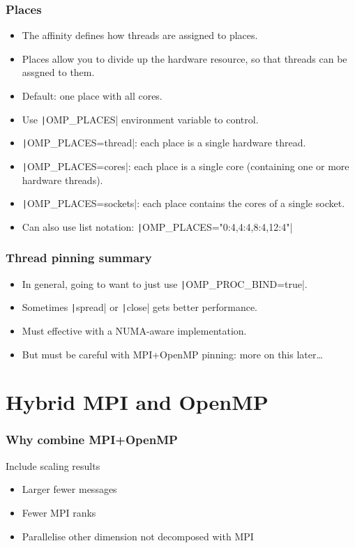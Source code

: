 \documentclass{beamer}
\begin{document}
\begin{frame}
\frametitle{Places}
\begin{itemize}
  \item The affinity defines how threads are assigned to places.
  \item Places allow you to divide up the hardware resource, so that threads can be assgned to them.
  \item Default: one place with all cores.
  \item Use \texttt|OMP_PLACES| environment variable to control.
  \item \texttt|OMP_PLACES=thread|: each place is a single hardware thread.
  \item \texttt|OMP_PLACES=cores|: each place is a single core (containing one or more hardware threads).
  \item \texttt|OMP_PLACES=sockets|: each place contains the cores of a single socket.
  \item Can also use list notation: \texttt|OMP_PLACES="{0:4},{4:4},{8:4},{12:4}"|
\end{itemize}
\end{frame}

\begin{frame}
\frametitle{Thread pinning summary}
\begin{itemize}
  \item In general, going to want to just use \texttt|OMP_PROC_BIND=true|.
  \item Sometimes \texttt|spread| or \texttt|close| gets better performance.
  \item Must effective with a NUMA-aware implementation.
  \item But must be careful with MPI+OpenMP pinning: more on this later\dots
\end{itemize}
\end{frame}

\section{Hybrid MPI and OpenMP}
\begin{frame}
\frametitle{Why combine MPI+OpenMP}
Include scaling results
\begin{itemize}
  \item Larger fewer messages
  \item Fewer MPI ranks
  \item Parallelise other dimension not decomposed with MPI
\end{itemize}
\end{frame}
\end{document}
